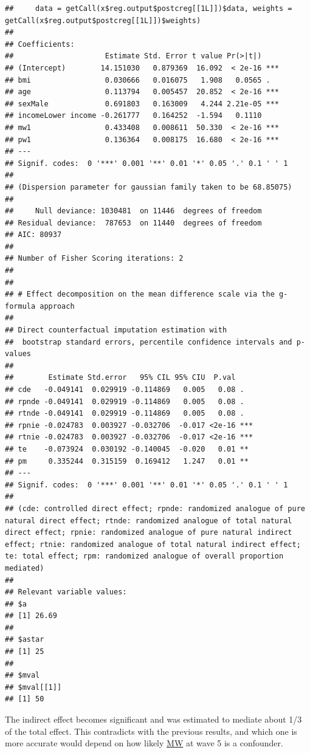 \documentclass[
]{book}
\begin{document}
\begin{verbatim}
##     data = getCall(x$reg.output$postcreg[[1L]])$data, weights = getCall(x$reg.output$postcreg[[1L]])$weights)
## 
## Coefficients:
##                     Estimate Std. Error t value Pr(>|t|)    
## (Intercept)        14.151030   0.879369  16.092  < 2e-16 ***
## bmi                 0.030666   0.016075   1.908   0.0565 .  
## age                 0.113794   0.005457  20.852  < 2e-16 ***
## sexMale             0.691803   0.163009   4.244 2.21e-05 ***
## incomeLower income -0.261777   0.164252  -1.594   0.1110    
## mw1                 0.433408   0.008611  50.330  < 2e-16 ***
## pw1                 0.136364   0.008175  16.680  < 2e-16 ***
## ---
## Signif. codes:  0 '***' 0.001 '**' 0.01 '*' 0.05 '.' 0.1 ' ' 1
## 
## (Dispersion parameter for gaussian family taken to be 68.85075)
## 
##     Null deviance: 1030481  on 11446  degrees of freedom
## Residual deviance:  787653  on 11440  degrees of freedom
## AIC: 80937
## 
## Number of Fisher Scoring iterations: 2
## 
## 
## # Effect decomposition on the mean difference scale via the g-formula approach
##  
## Direct counterfactual imputation estimation with 
##  bootstrap standard errors, percentile confidence intervals and p-values 
##  
##        Estimate Std.error   95% CIL 95% CIU  P.val    
## cde   -0.049141  0.029919 -0.114869   0.005   0.08 .  
## rpnde -0.049141  0.029919 -0.114869   0.005   0.08 .  
## rtnde -0.049141  0.029919 -0.114869   0.005   0.08 .  
## rpnie -0.024783  0.003927 -0.032706  -0.017 <2e-16 ***
## rtnie -0.024783  0.003927 -0.032706  -0.017 <2e-16 ***
## te    -0.073924  0.030192 -0.140045  -0.020   0.01 ** 
## pm     0.335244  0.315159  0.169412   1.247   0.01 ** 
## ---
## Signif. codes:  0 '***' 0.001 '**' 0.01 '*' 0.05 '.' 0.1 ' ' 1
## 
## (cde: controlled direct effect; rpnde: randomized analogue of pure natural direct effect; rtnde: randomized analogue of total natural direct effect; rpnie: randomized analogue of pure natural indirect effect; rtnie: randomized analogue of total natural indirect effect; te: total effect; rpm: randomized analogue of overall proportion mediated)
## 
## Relevant variable values: 
## $a
## [1] 26.69
## 
## $astar
## [1] 25
## 
## $mval
## $mval[[1]]
## [1] 50
\end{verbatim}

The indirect effect becomes significant and was estimated to mediate about 1/3 of the total effect. This contradicts with the previous results, and which one is more accurate would depend on how likely \hyperref[acronyms_MW]{MW} at wave 5 is a confounder.
\end{document}
